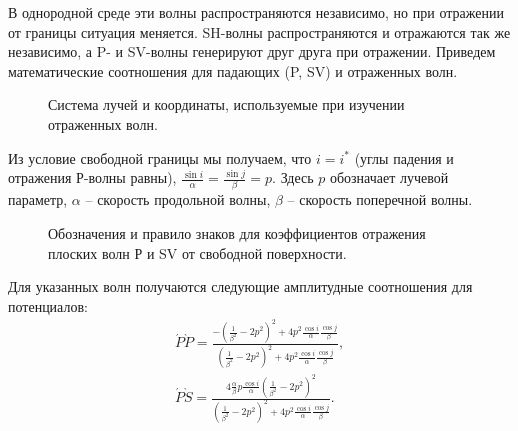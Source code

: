 В однородной среде эти волны распространяются независимо, но при отражении от границы ситуация меняется. SH-волны распространяются и отражаются так же независимо, а P- и SV-волны генерируют друг друга при отражении. Приведем математические соотношения для падающих (P, SV) и отраженных волн.

\begin{figure}[h]
\caption{Система лучей и координаты, используемые при изучении отраженных волн.}
\end{figure}

Из условие свободной границы мы получаем, что $i = i^*$ (углы падения и отражения Р-волны равны), $\frac{\sin{i}}{\alpha} = \frac{\sin{j}}{\beta} = p$. Здесь $p$ обозначает лучевой параметр, $\alpha$ – скорость продольной волны, $\beta$ – скорость поперечной волны. 

\begin{figure}[h]
\caption{Обозначения и правило знаков для коэффициентов отражения плоских волн Р и SV от свободной поверхности.}
\end{figure}

Для указанных волн получаются следующие амплитудные соотношения для потенциалов:
\begin{eqnarray}
\acute{P}\grave{P} = \frac{ -(\frac{1}{\beta^2} - 2p^2)^2 + 4p^2\frac{\cos{i}}{\alpha}\frac{\cos{j}}{\beta} }{ (\frac{1}{\beta^2} - 2p^2)^2 + 4p^2\frac{\cos{i}}{\alpha}\frac{\cos{j}}{\beta} }, \nonumber\\
\acute{P}\grave{S} = \frac{ 4\frac{\alpha}{\beta}p\frac{\cos{i}}{\alpha}(\frac{1}{\beta^2} - 2p^2)^2 }{ (\frac{1}{\beta^2} - 2p^2)^2 + 4p^2\frac{\cos{i}}{\alpha}\frac{\cos{j}}{\beta} }.
\end{eqnarray}

